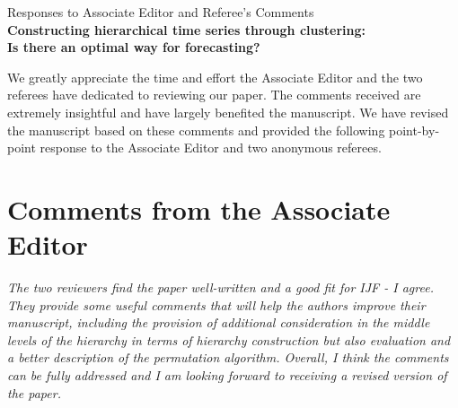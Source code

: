 \documentclass{article}
\numberwithin{equation}{section}
\theoremstyle{plain}
\theoremstyle{definition}
\theoremstyle{remark}
\begin{document}
\begin{center}
\setlength{\unitlength}{2cm}

{\Large Responses to Associate Editor and Referee's Comments \\[%
0pt]
\vspace{0.02in}
\large\textbf{Constructing hierarchical time series through clustering: \\Is there an optimal way for forecasting?}}
\end{center}


\noindent We greatly appreciate the time and effort the Associate Editor and the two referees have dedicated to reviewing our paper. The comments received are extremely insightful and have largely benefited the manuscript. We have revised the manuscript based on these comments and provided the following point-by-point response to the Associate Editor and two anonymous referees.
\vspace{-0.4in}
\section*{Comments from the Associate Editor}

\textit{The two reviewers find the paper well-written and a good fit for IJF - I agree. They provide some useful comments that will help the authors improve their manuscript, including the provision of additional consideration in the middle levels of the hierarchy in terms of hierarchy construction but also evaluation and a better description of the permutation algorithm. Overall, I think the comments can be fully addressed and I am looking forward to receiving a revised version of the paper.}
\end{document}
